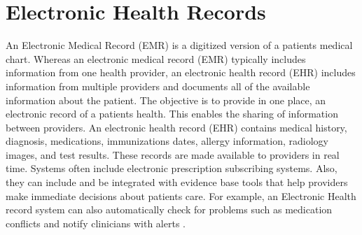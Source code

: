 \documentclass[sigconf]{acmart}
\begin{document}
\section{Electronic Health Records}

An Electronic Medical Record (EMR) is a digitized version of a patients medical chart.  Whereas an electronic medical record (EMR) typically includes information from one health provider, an electronic health record (EHR) includes information from multiple providers and documents all of the available information about the patient.  The objective is to provide in one place, an electronic record of a patients health. This enables the sharing of information between providers. An electronic health record (EHR) contains medical history, diagnosis, medications, immunizations dates, allergy information, radiology images, and test results. These records are made available to providers in real time.  Systems often include electronic prescription subscribing systems. Also, they can include and be integrated with evidence base tools that help providers make immediate decisions about patients care. For example, an Electronic Health record system can also automatically check for problems such as medication conflicts and notify clinicians with alerts \cite{www-google-elec}. 
\end{document}
